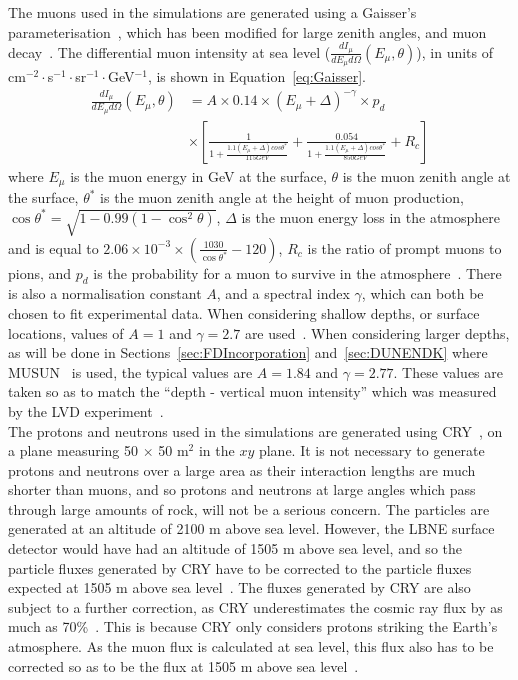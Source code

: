 The muons used in the simulations are generated using a Gaisser's parameterisation~\citep{Gaisser}, which has been modified for large zenith angles, and muon decay~\citep{PhysRevD.58.092005}. The differential muon intensity at sea level ($\frac{dI_{\mu}}{dE_{\mu} d\Omega}(E_{\mu}, \theta)$), in units of cm$^{-2}\cdot$s$^{-1}\cdot$sr$^{-1}\cdot$GeV$^{-1}$, is shown in Equation~\ref{eq:Gaisser}.
\begin{equation}
   \begin{aligned}
      \label{eq:Gaisser}
      \frac{dI_{\mu}}{dE_{\mu} d\Omega}(E_{\mu}, \theta) &=
      A \times 0.14\times (E_{\mu} + \Delta)^{-\gamma} \times p_{d} \\
      &\times \left[ \frac{1}{1 + \frac{ 1.1(E_{\mu}+\Delta)cos\theta^{*} }{ 115 GeV } } +
      \frac{0.054}{1 + \frac{1.1(E_{\mu}+\Delta)cos\theta^{*}}{850 GeV}} + R_{c} \right]
   \end{aligned}
\end{equation} 
where $E_{\mu}$ is the muon energy in GeV at the surface, $\theta$ is the muon zenith angle at the surface, $\theta^{*}$ is the muon zenith angle at the height of muon production, $\cos\theta^{*} = \sqrt{1-0.99(1-\cos^{2}\theta)}$, $\Delta$ is the muon energy loss in the atmosphere and is equal to $2.06\times10^{-3} \times \left(\frac{1030}{\cos\theta^{*}} - 120 \right)$, $R_{c}$ is the ratio of prompt muons to pions, and $p_d$ is the probability for a muon to survive in the atmosphere~\citep{PhysRevLett.51.227}. There is also a normalisation constant $A$, and a spectral index $\gamma$, which can both be chosen to fit experimental data. When considering shallow depths, or surface locations, values of $A=1$ and $\gamma=2.7$ are used~\citep{Gaisser}. When considering larger depths, as will be done in Sections~\ref{sec:FDIncorporation} and~\ref{sec:DUNENDK} where MUSUN~\citep{MUSUN, MUSUN2} is used, the typical values are $A=1.84$ and $\gamma=2.77$. These values are taken so as to match the ``depth - vertical muon intensity'' which was measured by the LVD experiment~\citep{PhysRevD.58.092005}. \\

The protons and neutrons used in the simulations are generated using CRY~\citep{CRY,CRY2}, on a plane measuring 50 $\times$ 50 m$^{2}$ in the $xy$ plane. It is not necessary to generate protons and neutrons over a large area as their interaction lengths are much shorter than muons, and so protons and neutrons at large angles which pass through large amounts of rock, will not be a serious concern. The particles are generated at an altitude of 2100 m above sea level. However, the LBNE surface detector would have had an altitude of 1505 m above sea level, and so the particle fluxes generated by CRY have to be corrected to the particle fluxes expected at 1505 m above sea level~\citep{MartinsThesis}. The fluxes generated by CRY are also subject to a further correction, as CRY underestimates the cosmic ray flux by as much as 70\%~\citep{LBNE7517}. This is because CRY only considers protons striking the Earth's atmosphere. As the muon flux is calculated at sea level, this flux also has to be corrected so as to be the flux at 1505 m above sea level~\citep{MartinsThesis}. \\

